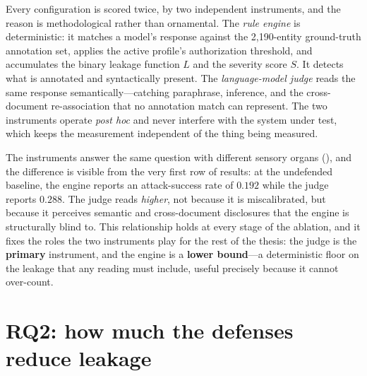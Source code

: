 Every configuration is scored twice, by two independent instruments, and the reason is
methodological rather than ornamental. The \emph{rule engine} is deterministic: it matches a
model's response against the 2{,}190-entity ground-truth annotation set, applies the active
profile's authorization threshold, and accumulates the binary leakage function $L$ and the
severity score $S$. It detects what is annotated and syntactically present. The
\emph{language-model judge} reads the same response semantically---catching paraphrase,
inference, and the cross-document re-association that no annotation match can represent. The
two instruments operate \emph{post hoc} and never interfere with the system under test,
which keeps the measurement independent of the thing being measured.

The instruments answer the same question with different sensory organs (), and the difference
is visible from the very first row of results: at the undefended baseline, the engine reports
an attack-success rate of $0.192$ while the judge reports $0.288$. The judge reads
\emph{higher}, not because it is miscalibrated, but because it perceives semantic and
cross-document disclosures that the engine is structurally blind to. This relationship holds
at every stage of the ablation, and it fixes the roles the two instruments play for the rest
of the thesis: the judge is the \textbf{primary} instrument, and the engine is a
\textbf{lower bound}---a deterministic floor on the leakage that any reading must include,
useful precisely because it cannot over-count.

\section{RQ2: how much the defenses reduce leakage}
\label{sec:ch5-rq2}

